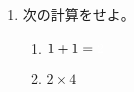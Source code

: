 \documentclass{jlreq}
\newcounter{Mode}%
\newcommand{\Kaitou}[1]{
    \textcolor{kaitouiro}{#1}
}
\begin{document}
\setcounter{Mode}{1}
\begin{enumerate}
    \item 次の計算をせよ。
    \begin{enumerate}
        \item $1+1=\Kaitou{2}$
        \item $2\times 4$
    \end{enumerate}
\end{enumerate}
\end{document}
